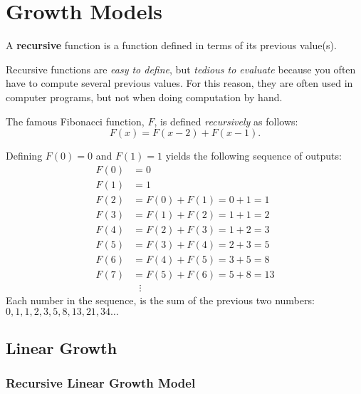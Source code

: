 \chapter{Growth Models}%
\label{chap:growth-models}

\begin{definition}
  A \textbf{recursive} function is a function defined in terms of its
  previous value(s).
\end{definition}

\begin{note}
  Recursive functions are \emph{easy to define}, but \emph{tedious to
    evaluate} because you often have to compute several previous
  values. For this reason, they are often used in computer programs,
  but not when doing computation by hand.
\end{note}

\begin{example}
  The famous Fibonacci function, \(F\), is defined \emph{recursively}
  as follows:
  \[
    F(x) = F(x-2)+F(x-1).
  \]

  Defining \(F(0)=0\) and \(F(1)=1\) yields the following sequence of
  outputs:
  \begin{align*}
    F(0) &= 0 \\
    F(1) &= 1 \\
    F(2) &= F(0) + F(1) = 0+1 = 1 \\
    F(3) &= F(1) + F(2) = 1+1 = 2 \\
    F(4) &= F(2) + F(3) = 1+2 = 3 \\
    F(5) &= F(3) + F(4) = 2+3 = 5 \\
    F(6) &= F(4) + F(5) = 3+5 = 8 \\
    F(7) &= F(5) + F(6) = 5+8 = 13 \\
     & \: \: \: \vdots
  \end{align*}
  Each number in the sequence, is the sum of the previous two numbers:
  \(0, 1, 1, 2, 3, 5, 8, 13, 21, 34\ldots\)
\end{example}

\section{Linear Growth}%
\label{sec:linear-growth}

\subsection{Recursive Linear Growth Model}%
\label{sec:recursive-linear}

